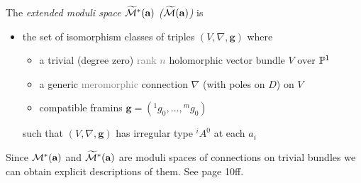 \begin{defn}[2.6]
  The \emph{extended moduli space $\widetilde\cM^*(\textbf{a})$
  \textcolor{green!40!black}{($\widetilde\cM(\textbf{a})$)}} is
  \begin{itemize}
    \item the set of isomorphism classes of triples $(V,\nabla,\textbf{g})$
      where
      \begin{itemize}
        \item a trivial \textcolor{green!40!black}{(degree zero)}
          \textcolor{gray}{rank $n$} holomorphic vector bundle $V$ over $\P^1$
        \item a generic \textcolor{gray}{meromorphic} connection $\nabla$
          (with poles on $D$) on $V$
        \item compatible framins $\textbf{g}=({}^1g_0,\dots,{}^mg_0)$
      \end{itemize}
      such that $(V,\nabla,\textbf{g})$ has irregular type ${}^iA^0$ at each
      $a_i$
  \end{itemize}
\end{defn}
Since $\cM^*(\textbf{a})$ and $\widetilde\cM^*(\textbf{a})$ are moduli spaces
of connections on trivial bundles we can obtain explicit descriptions of them.
See \cite{thboalch} page 10ff.

\begin{comment}
  \section{Definition from \cite{sabbah_cimpa90}}
  \begin{defn}
    A \emph{meromorphic connection} $\cM_K$ is a 
    \begin{itemize}
      \item $K$-vector space of finite dimension
      \item equipped with
        \begin{itemize}
          \item a $\C$-linear derivation $\partial_x: \cM_K\to\cM_K$
        \end{itemize}
        such that, for all $f\in K$ and all $m\in\cM_K$ one has
        \[
          \partial_x(fm)=\frac{\partial f}{\partial m}+f\partial_xm.
        \]
    \end{itemize}
  \end{defn}

  \begin{thm}
    Let $\cM_{\hat K}$ be a formal meromorphic connection. There exists an
    integer $q$ such that the connection $\pi^*\cM_{\hat K}=\cM_{\hat L}$ is
    isomorphic to a direct sum of elementary formal meromorphic connections.
  \end{thm}
\end{comment}

